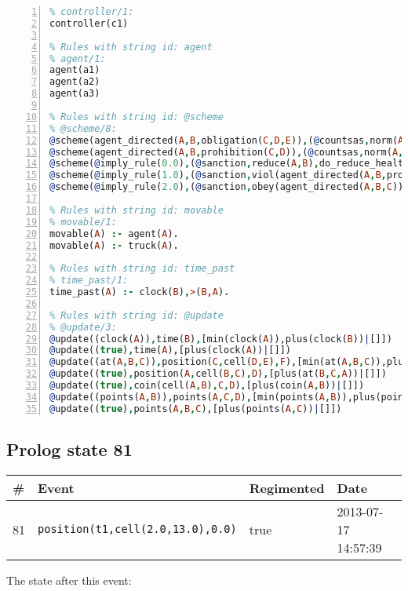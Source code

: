 \documentclass[11pt]{article}\usepackage[utf8]{inputenc}\usepackage{geometry}
\begin{document}
\begin{lstlisting}[language=Prolog, numbers=left]
% Rules with string id: controller
% controller/1:
controller(c1)

% Rules with string id: agent
% agent/1:
agent(a1)
agent(a2)
agent(a3)

% Rules with string id: @scheme
% @scheme/8:
@scheme(agent_directed(A,B,obligation(C,D,E)),(@countsas,norm(A,B,F,obligation(C,D,E)),F),false,(listTrue(C)),(time_past(D)),false,[plus(viol(agent_directed(A,B,obligation(C,D,E))))|[]],[plus(obey(agent_directed(A,B,obligation(C,D,E))))|[]])
@scheme(agent_directed(A,B,prohibition(C,D)),(@countsas,norm(A,B,E,prohibition(C,D)),E),(listTrue(C)),false,(false),false,[plus(viol(agent_directed(A,B,prohibition(C,D))))|[]],[plus(obey(agent_directed(A,B,prohibition(C,D))))|[]])
@scheme(@imply_rule(0.0),(@sanction,reduce(A,B),do_reduce_health(A,B),notifyAgent(A,changed(status))),true,false,false,false,[min(reduce(A,B))|[]],[])
@scheme(@imply_rule(1.0),(@sanction,viol(agent_directed(A,B,prohibition(C,D))),do_sanction(D)),true,false,false,false,[min(viol(agent_directed(A,B,prohibition(C,D))))|[]],[])
@scheme(@imply_rule(2.0),(@sanction,obey(agent_directed(A,B,C))),true,false,false,false,[min(obey(agent_directed(A,B,C)))|[]],[])

% Rules with string id: movable
% movable/1:
movable(A) :- agent(A).
movable(A) :- truck(A).

% Rules with string id: time_past
% time_past/1:
time_past(A) :- clock(B),>(B,A).

% Rules with string id: @update
% @update/3:
@update((clock(A)),time(B),[min(clock(A)),plus(clock(B))|[]])
@update((true),time(A),[plus(clock(A))|[]])
@update((at(A,B,C)),position(C,cell(D,E),F),[min(at(A,B,C)),plus(at(D,E,C))|[]])
@update((true),position(A,cell(B,C),D),[plus(at(B,C,A))|[]])
@update((true),coin(cell(A,B),C,D),[plus(coin(A,B))|[]])
@update((points(A,B)),points(A,C,D),[min(points(A,B)),plus(points(A,D))|[]])
@update((true),points(A,B,C),[plus(points(A,C))|[]])

\end{lstlisting}
\clearpage 
\subsection{Prolog state 81}
\begin{table}[ht]
\centering 
\begin{tabular}{l l l l} 
\textbf{\#} & \textbf{Event} & \textbf{Regimented} & \textbf{Date} \\ [0.5ex] 
\hline
81&\texttt{position(t1,cell(2.0,13.0),0.0)}&true&2013-07-17 14:57:39\\ [1ex] \hline\end{tabular}
\end{table}
The state after this event:
\end{document}
